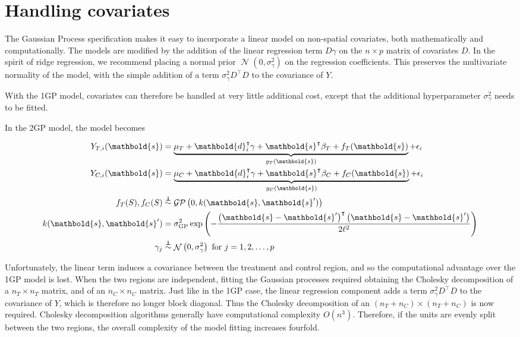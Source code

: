 \documentclass[letter]{article}
\newcommand{\genericdel}[3]{%
      \left#1#3\right#2
    }
\newcommand{\del}[1]{\genericdel(){#1}}
\DeclareMathOperator{\normal}{\mathcal{N}}
\newcommand{\gp}{\mathcal{GP}}
\newcommand{\trans}{^{\intercal}}
\newcommand{\sigmaf}{\sigma_{\mathrm{GP}}}
\newcommand{\sigmagamma}{\sigma_{\gamma}}
\newcommand{\svec}{\mathbold{s}}
\newcommand{\dvec}{\mathbold{d}}
\newcommand{\indep}{\protect\mathpalette{\protect\independenT}{\perp}}
\def\independenT#1#2{\mathrel{\rlap{$#1#2$}\mkern2mu{#1#2}}}
\begin{document}
    	\section{Handling covariates}\label{handling-covariates}

The Gaussian Process specification makes it easy to incorporate a linear
model on non-spatial covariates, both mathematically and
computationally. The models are modified by the addition of the linear
regression term \(D \gamma\) on the \(n \times p\) matrix of covariates
\(D\). In the spirit of ridge regression, we recommend placing a normal
prior \(\normal(0,\sigmagamma^2)\) on the regression coefficients. This
preserves the multivariate normality of the model, with the simple
addition of a term \(\sigmagamma^2 D\trans D\) to the covariance of
\(Y\).

With the 1GP model, covariates can therefore be handled at very little
additional cost, except that the additional hyperparameter
\(\sigmagamma^2\) needs to be fitted.

In the 2GP model, the model becomes

\begin{equation}
\begin{split}
Y_{T,i}(\svec) &= \underbrace{\mu_T + \dvec_i\trans \gamma + \svec\trans\beta_T + f_T(\svec)}_{g_T(\svec)} + \epsilon_i \\
Y_{C,i}(\svec) &= \underbrace{\mu_C + \dvec_i\trans \gamma + \svec\trans\beta_C + f_C(\svec)}_{g_C(\svec)} + \epsilon_i \\
f_T(S), f_C(S) &\overset{\indep}{\sim} \gp\del{0, k(\svec, \svec')} \\
k(\svec,\svec') &= \sigmaf^2 \exp\del{ - \frac{\del{\svec-\svec'}\trans\del{\svec-\svec'}}{2 \ell^2}} \\
\gamma_j &\overset{\indep}{\sim} \normal\del{0,\sigmagamma^2}\text{ for }j=1,2,\ldots,p
\end{split}
\end{equation}

Unfortunately, the linear term induces a covariance between the
treatment and control region, and so the computational advantage over
the 1GP model is lost. When the two regions are independent, fitting the
Gaussian processes required obtaining the Cholesky decomposition of a
\(n_T \times n_T\) matrix, and of an \(n_C \times n_C\) matrix. Just
like in the 1GP case, the linear regression component adds a term
\(\sigmagamma^2 D\trans D\) to the covariance of \(Y\), which is
therefore no longer block diagonal. Thus the Cholesky decomposition of
an \((n_T+n_C) \times (n_T+n_C)\) is now required. Cholesky
decomposition algorithms generally have computational complexity
\(O(n^3)\). Therefore, if the units are evenly split between the two
regions, the overall complexity of the model fitting increases fourfold.
    
\end{document}

